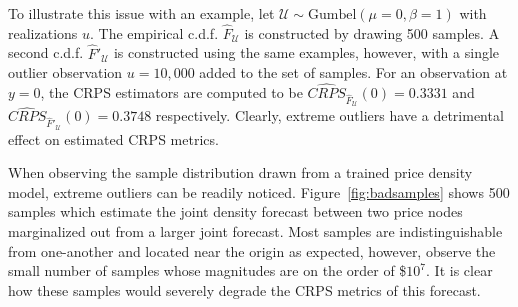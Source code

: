 To illustrate this issue with an example, let $\mathcal{U} \sim \text{Gumbel}(\mu=0, \beta=1)$ with realizations $u$.
The empirical c.d.f. $\hat{F}_\mathcal{U}$ is constructed by drawing 500 samples.
A second c.d.f. $\hat{F}'_\mathcal{U}$ is constructed using the same examples, however, with a single outlier observation
$u=10,000$ added to the set of samples.
For an observation at $y=0$, the CRPS estimators are computed to be $\widehat{CRPS}_{\hat{F}_\mathcal{U}}(0) = 0.3331$
and $\widehat{CRPS}_{\hat{F}'_\mathcal{U}}(0) = 0.3748$ respectively.
Clearly, extreme outliers have a detrimental effect on estimated CRPS metrics.


When observing the sample distribution drawn from a trained price density model, extreme outliers can be readily noticed.
Figure~\ref{fig:badsamples} shows 500 samples which estimate the joint density forecast between two price nodes
marginalized out from a larger joint forecast.
Most samples are indistinguishable from one-another and located near the origin as expected, however,
observe the small number of samples whose magnitudes are on the order of \$$10^7$.
It is clear how these samples would severely degrade the CRPS metrics of this forecast.

